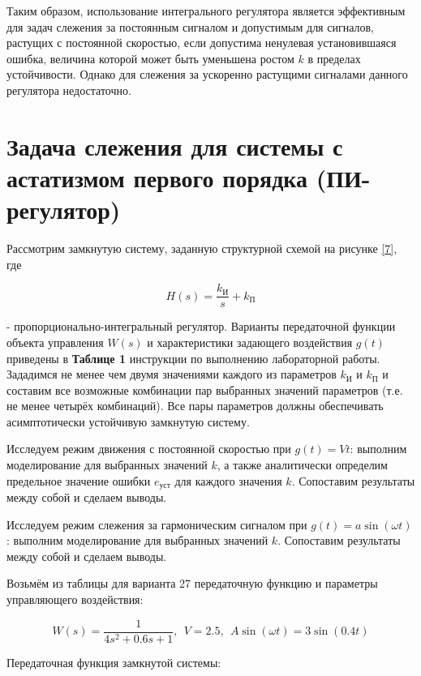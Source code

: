Таким образом, использование интегрального регулятора является эффективным для задач слежения за постоянным сигналом и допустимым для сигналов, растущих с постоянной скоростью, если допустима ненулевая установившаяся ошибка, величина которой может быть уменьшена ростом $k$ в пределах устойчивости. Однако для слежения за ускоренно растущими сигналами данного регулятора недостаточно.



\section{Задача слежения для системы с астатизмом первого порядка (ПИ-регулятор)}


Рассмотрим замкнутую систему, заданную структурной схемой на рисунке \ref{7}, где

\begin{par}
$$H(s)=\frac{k_{\text{И}} }{s}+k_{\text{П}}$$
\end{par}


- пропорционально-интегральный регулятор. Варианты передаточной функции объекта управления $W(s)$ и характеристики задающего воздействия $g(t)$ приведены в \textbf{Таблице 1 }инструкции по выполнению лабораторной работы. Зададимся не менее чем двумя значениями каждого из параметров $k_{\text{И}}$ и $k_{\text{П}}$ и составим все возможные комбинации пар выбранных значений параметров (т.е. не менее четырёх комбинаций). Все пары параметров должны обеспечивать асимптотически устойчивую замкнутую систему.


Исследуем режим движения с постоянной скоростью при $g(t)=Vt$: выполним моделирование для выбранных значений $k$, а также аналитически определим предельное значение ошибки $e_{уст}$ для каждого значения $k$. Сопоставим результаты между собой и сделаем выводы.


Исследуем режим слежения за гармоническим сигналом при $g(t)=a\sin (\omega t)$: выполним моделирование для выбранных значений $k$. Сопоставим результаты между собой и сделаем выводы.




Возьмём из таблицы для варианта 27 передаточную функцию и параметры управляющего воздействия:

\begin{par}
$$W(s)=\frac{1}{4s^2 +0.6s+1},~~V=2.5,~~A\sin (\omega t)=3\sin (0.4t)$$
\end{par}


Передаточная функция замкнутой системы:

